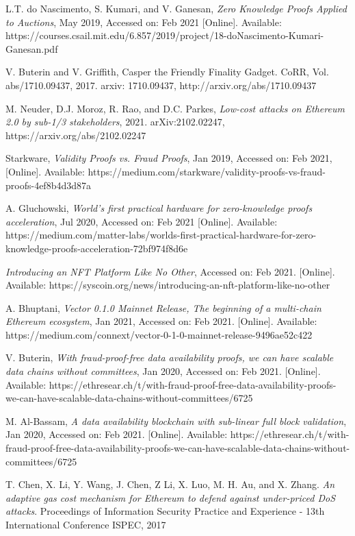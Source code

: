 \documentclass[peerreview]{ieeesyscoin}
\begin{document}
\begin{thebibliography}{00}
 L.T. do Nascimento, S. Kumari, and V. Ganesan, \textit{Zero Knowledge Proofs Applied to Auctions}, May 2019, Accessed on: Feb 2021 [Online].   Available: https://courses.csail.mit.edu/6.857/2019/project/18-doNascimento-Kumari-Ganesan.pdf

 V. Buterin and V. Griffith, Casper the Friendly Finality Gadget. CoRR, Vol. abs/1710.09437, 2017. arxiv: 1710.09437, http://arxiv.org/abs/1710.09437

 M. Neuder, D.J. Moroz, R. Rao, and D.C. Parkes, \textit{Low-cost attacks on Ethereum 2.0 by sub-1/3 stakeholders}, 2021. arXiv:2102.02247,  https://arxiv.org/abs/2102.02247

 Starkware, \textit{Validity Proofs vs. Fraud Proofs}, Jan 2019, Accessed on: Feb 2021, [Online]. Available: https://medium.com/starkware/validity-proofs-vs-fraud-proofs-4ef8b4d3d87a

 A. Gluchowski, \textit{World’s first practical hardware for zero-knowledge proofs acceleration}, Jul 2020, Accessed on: Feb 2021 [Online]. Available:  https://medium.com/matter-labs/worlds-first-practical-hardware-for-zero-knowledge-proofs-acceleration-72bf974f8d6e

  \textit{Introducing an NFT Platform Like No Other}, Accessed on: Feb 2021. [Online]. Available: https://syscoin.org/news/introducing-an-nft-platform-like-no-other

 A. Bhuptani, \textit{Vector 0.1.0 Mainnet Release, The beginning of a multi-chain Ethereum ecosystem}, Jan 2021, Accessed on: Feb 2021.  [Online]. Available:  https://medium.com/connext/vector-0-1-0-mainnet-release-9496ae52c422

  V. Buterin, \textit{With fraud-proof-free data availability proofs, we can have scalable data chains without committees}, Jan 2020, Accessed on: Feb 2021.  [Online]. Available:  https://ethresear.ch/t/with-fraud-proof-free-data-availability-proofs-we-can-have-scalable-data-chains-without-committees/6725

 M. Al-Bassam,\textit{ A data availability blockchain with sub-linear full block validation}, Jan 2020, Accessed on: Feb 2021.  [Online]. Available:  https://ethresear.ch/t/with-fraud-proof-free-data-availability-proofs-we-can-have-scalable-data-chains-without-committees/6725

  T. Chen, X. Li, Y. Wang, J. Chen, Z Li, X. Luo, M. H. Au, and X. Zhang. \textit{An adaptive gas cost mechanism for Ethereum to defend against under-priced DoS attacks}. Proceedings of Information Security Practice and Experience - 13th International Conference ISPEC, 2017


\end{thebibliography}
\end{document}
